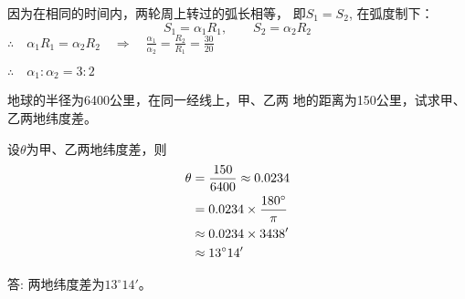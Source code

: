 \begin{solution}
    因为在相同的时间内，两轮周上转过的弧长相等，
    即$S_1=S_2$, 在弧度制下：
\[S_1=\alpha_1 R_1,\qquad S_2=\alpha_2 R_2\]
$\therefore\quad \alpha_1R_1=\alpha_2R_2 \quad \Rightarrow\quad \frac{\alpha_1}{\alpha_2}=\frac{R_2}{R_1}=\frac{30}{20}$

$\therefore\quad \alpha_1:\alpha_2=3:2 $
\end{solution}

\begin{example}
    地球的半径为6400公里，在同一经线上，甲、乙两
地的距离为150公里，试求甲、乙两地纬度差。
\end{example}


\begin{solution}
设$\theta$为甲、乙两地纬度差，则
\[\begin{split}
    \theta &= \dfrac{150}{6400}\approx 0.0234\\
    &=0.0234\times\dfrac{180^{\circ}}{\pi}\\
    &\approx 0.0234\times 3438'\\
    &\approx 13^{\circ}14'
\end{split}\]

答: 两地纬度差为$13^{\circ}14'$。
\end{solution}

